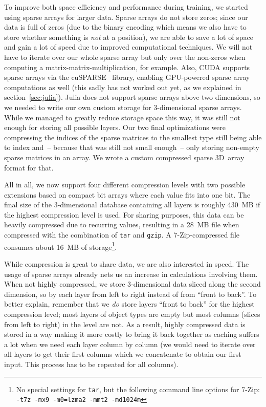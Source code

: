 To improve both space efficiency and performance during training, we
started using sparse arrays for larger data. Sparse arrays do not
store zeros; since our data is full of zeros (due to the binary
encoding which means we also have to store whether something is
\emph{not} at a position), we are able to save a lot of space and gain
a lot of speed due to improved computational techniques. We will not
have to iterate over our whole sparse array but only over the
non-zeros when computing a matrix-matrix-multiplication, for example.
Also, CUDA supports sparse arrays via the cuSPARSE~\cite{CuSPARSE2012}
library, enabling GPU-powered sparse array computations as well (this
sadly has not worked out yet, as we explained in
section~\ref{sec:julia}). Julia does not support sparse arrays above
two dimensions, so we needed to write our own custom storage for
3-dimensional sparse arrays. While we managed to greatly reduce
storage space this way, it was still not enough for storing all
possible layers. Our two final optimizations were compressing the
indices of the sparse matrices to the smallest type still being able
to index and~-- because that was still not small enough~-- only storing
non-empty sparse matrices in an array. We wrote a custom compressed
sparse 3D~array format for that.

All in all, we now support four different compression levels with two
possible extensions based on compact bit arrays where each value fits
into one bit. The final size of the 3-dimensional database containing
all layers is roughly 430~MB if the highest compression level is used.
For sharing purposes, this data can be heavily compressed due to
recurring values, resulting in a 28~MB file when compressed with the
combination of \texttt{tar} and \texttt{gzip}. A
\mbox{7-Zip}-compressed file consumes about 16~MB of
storage\footnote{No special settings for \texttt{tar}, but the
  following command line options for \mbox{7-Zip}: \texttt{-t7z -mx9
    -m0=lzma2 -mmt2 -md1024m}}.
\medskip

While compression is great to share data, we are also interested in
speed. The usage of sparse arrays already nets us an increase in
calculations involving them. When not highly compressed, we store
3-dimensional data sliced along the second dimension, so by each layer
from left to right instead of from ``front to back''. To better
explain, remember that we \emph{do} store layers ``front to back'' for
the highest compression level; most layers of object types are empty
but most columns (slices from left to right) in the level are
not. %
As a result, highly compressed data is stored in a way making it more
costly to bring it back together as caching suffers a lot when we need
each layer column by column (we would need to iterate over all layers
to get their first columns which we concatenate to obtain our first
input. This process has to be repeated for all columns).

